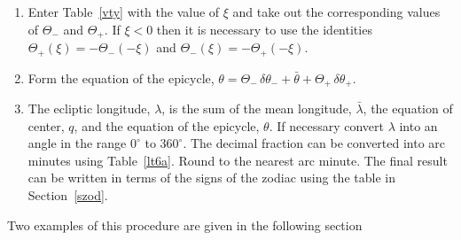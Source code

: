 \begin{enumerate}
\item Enter Table~\ref{vty} with the value of $\xi$ and take out
the corresponding values of $\Theta_-$ and $\Theta_+$. If $\xi<0$ then
it is necessary to use the identities $\Theta_+(\xi)=-\Theta_-(-\xi)$
and $\Theta_-(\xi)=-\Theta_+(-\xi)$. 

\item Form the equation of the epicycle, $\theta = \Theta_-\,\delta\theta_-+ \bar{\theta}
+ \Theta_+\,\delta\theta_+$.

\item The ecliptic longitude, $\lambda$, is the sum of the mean longitude, $\bar{\lambda}$,  the equation of center, $q$, and the equation
of the epicycle, $\theta$. If necessary convert $\lambda$
into  an angle in the range $0^\circ$ to $360^\circ$. The decimal fraction can
be converted into arc minutes
using Table~\ref{lt6a}. Round to the nearest arc minute. The final result
can be written in terms of the signs of the zodiac using the table in Section~\ref{szod}.
\end{enumerate}
Two examples of this procedure are given in the following section

